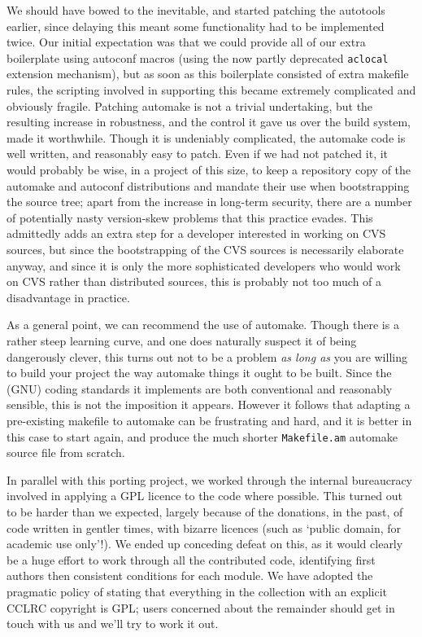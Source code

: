 \documentclass{speauth}
\begin{document}
We should have bowed to the inevitable, and started patching the
autotools earlier, since delaying this meant some functionality had to be
implemented twice.  Our initial expectation was that we could provide
all of our extra boilerplate using autoconf macros (using the now
partly deprecated \texttt{aclocal} extension mechanism), but as soon as
this boilerplate consisted of extra makefile rules, the scripting
involved in supporting this became extremely complicated and obviously
fragile.  Patching automake is not a trivial undertaking, but the
resulting increase in robustness, and the control it gave us over the
build system, made it worthwhile.  Though it is undeniably
complicated, the automake code is well written, and reasonably easy to
patch.  Even if we had not patched it, it
would probably be wise, in a project of this size, to keep a
repository copy of the automake and autoconf distributions and mandate
their use when bootstrapping the source tree; apart from the increase
in long-term security, there are a number of potentially nasty
version-skew problems that this practice evades.  This admittedly adds
an extra step for a developer interested in working on CVS sources,
but since the bootstrapping of the CVS sources is necessarily
elaborate anyway, and since it is only the more sophisticated
developers who would work on CVS rather than distributed sources, this
is probably not too much of a disadvantage in practice.

As a general point, we can recommend the use of automake.  Though
there is a rather steep learning curve, and one does naturally suspect
it of being dangerously clever, this turns out not to be a problem
\emph{as long as} you are willing to build your project the way
automake things it ought to be built.  Since the (GNU) coding
standards it implements are both conventional and reasonably sensible,
this is not the imposition it appears.  However it follows that
adapting a pre-existing makefile to automake can be frustrating and
hard, and it is better in this case to start again, and produce the
much shorter \texttt{Makefile.am} automake source file from scratch.

In parallel with this porting project, we worked through the internal
bureaucracy involved in applying a GPL licence to the code where
possible.  This turned out to be harder than we expected, largely
because of the donations, in the past, of code written in gentler
times, with bizarre licences (such as `public domain, for academic use
only'!).  We ended up conceding defeat on this, as it would clearly be
a huge effort to work through all the contributed code, identifying
first authors then consistent conditions for each module.  We have
adopted the pragmatic policy of stating that everything in the
collection with an explicit CCLRC copyright is GPL; users concerned
about the remainder should get in touch with us and we'll try to work
it out.
\end{document}
